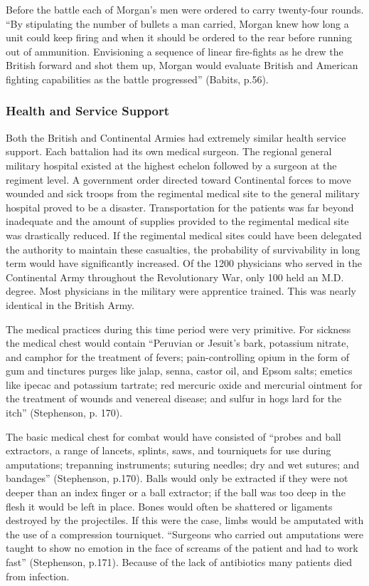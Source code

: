 Before the battle each of Morgan’s men were ordered to carry twenty-four rounds.
“By stipulating the number of bullets a man carried, Morgan knew how long a unit
could keep firing and when it should be ordered to the rear before running out
of ammunition.  Envisioning a sequence of linear fire-fights as he drew the
British forward and shot them up, Morgan would evaluate British and American
fighting capabilities as the battle progressed” (Babits, p.56).   


\subsubsection{Health and Service Support}

Both the British and Continental Armies had extremely similar health
service support.  Each battalion had its own medical surgeon.  The regional
general military hospital existed at the highest echelon followed by a surgeon
at the regiment level.  A government order directed toward Continental forces to
move wounded and sick troops from the regimental medical site to the general
military hospital proved to be a disaster.  Transportation for the patients was
far beyond inadequate and the amount of supplies provided to the regimental
medical site was drastically reduced.  If the regimental medical sites could
have been delegated the authority to maintain these casualties, the probability
of survivability in long term would have significantly increased.   Of the 1200
physicians who served in the Continental Army throughout the Revolutionary War,
only 100 held an M.D. degree.  Most physicians in the military were apprentice
trained.  This was nearly identical in the British Army.  

The medical practices during this time period were very primitive.  For sickness
the medical chest would contain “Peruvian or Jesuit’s bark, potassium nitrate,
and camphor for the treatment of fevers; pain-controlling opium in the form of
gum and tinctures purges like jalap, senna, castor oil, and Epsom salts; emetics
like ipecac and potassium tartrate; red mercuric oxide and mercurial ointment
for the treatment of wounds and venereal disease; and sulfur in hogs lard for
the itch” (Stephenson, p. 170).  

	   The basic medical chest for combat would have consisted of “probes
and ball extractors, a range of lancets, splints, saws, and tourniquets for use
during amputations; trepanning instruments; suturing needles; dry and wet
sutures; and bandages” (Stephenson, p.170).  Balls would only be extracted if
they were not deeper than an index finger or a ball extractor; if the ball was
too deep in the flesh it would be left in place.  Bones would often be shattered
or ligaments destroyed by the projectiles.  If this were the case, limbs would
be amputated with the use of a compression tourniquet.  “Surgeons who carried
out amputations were taught to show no emotion in the face of screams of the
patient and had to work fast” (Stephenson, p.171).   Because of the lack of
antibiotics many patients died from infection.  

